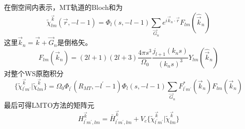 在倒空间内表示，MT轨道的Bloch和为
\begin{equation}
  \tilde\chi_{lm}^{\vec k}(\vec r,-l-1)=\Phi_l(s,-l-1)\sum_{\vec G_n}e^{i\vec k_n\cdot\vec r}F_{lm}(\hat{\vec k}_n)
  \label{eq:solid-179}
\end{equation}
这里$\vec k_n=\vec k+\vec G_n$是倒格矢。
\begin{equation}
  F_{lm}(\vec k_n)=(2l+1)(2l+3)\frac{4\pi s^3}{\Omega_0}\frac{j_{l+1}(k_ns)}{(k_n s)^3}Y_{lm}(\hat{\vec k}_n)
  \label{eq:solid-180}
\end{equation}
对整个WS原胞积分
\begin{equation}
  \{\tilde\chi_{l^{\prime}m^{\prime}}^{\vec k}|\tilde\chi_{lm}^{\vec k}\}=\Omega_0\Phi_{l^{\prime}}(R_{MT},-l^{\prime}-1)\Phi_l(s,-l-1)\sum_{\vec G_n}F_{l^{\prime}m^{\prime}}^{\ast}(\vec k_n)F_{lm}(\vec k_n)
  \label{eq:solid-181}
\end{equation}
最后可得LMTO方法的矩阵元
\begin{equation}
  H_{l^{\prime}m^{\prime},lm}^{\vec k}=\bar H_{l^{\prime}m^{\prime},lm}^{\vec k}+V_c\{\tilde\chi_{l^{\prime}m^{\prime}}^{\vec k}|\tilde\chi_{lm}^{\vec k}\}
  \label{eq:solid-182}
\end{equation}
